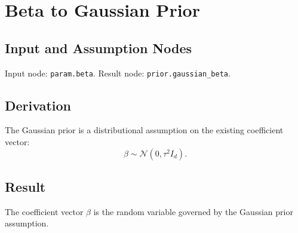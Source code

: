 \section{Beta to Gaussian Prior}
\label{edge:beta-to-gaussian-prior}

\subsection{Input and Assumption Nodes}
Input node: \texttt{param.beta}. Result node: \texttt{prior.gaussian\_beta}.

\subsection{Derivation}
The Gaussian prior is a distributional assumption on the existing coefficient vector:
\[
  \beta \sim \mathcal{N}(0,\tau^2 I_d).
\]

\subsection{Result}
The coefficient vector \(\beta\) is the random variable governed by the Gaussian prior assumption.
